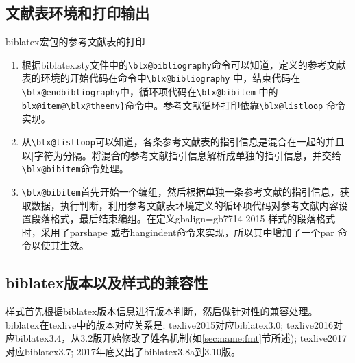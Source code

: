 \subsection{文献表环境和打印输出}
  biblatex宏包的参考文献表的打印
  \begin{enumerate}
  \item 根据biblatex.sty文件中的\verb|\blx@bibliography|命令可以知道，定义的参考文献表的环境的开始代码在命令中\verb|\blx@bibliography| 中，结束代码在\verb|\blx@endbibliography|中，循环项代码在\verb|\blx@bibitem| 中的\verb|blx@item@\blx@theenv}|命令中。参考文献循环打印依靠\verb|\blx@listloop| 命令实现。
  \item 从\verb|\blx@listloop|可以知道，各条参考文献表的指引信息是混合在一起的并且以|字符为分隔。将混合的参考文献指引信息解析成单独的指引信息，并交给\verb|\blx@bibitem|命令处理。
  \item \verb|\blx@bibitem|首先开始一个编组，然后根据单独一条参考文献的指引信息，获取数据，执行判断，利用参考文献表环境定义的循环项代码对参考文献内容设置段落格式，最后结束编组。在定义gbalign=gb7714-2015 样式的段落格式时，采用了parshape 或者hangindent命令来实现，所以其中增加了一个par 命令以使其生效。
  \end{enumerate}


\subsection{biblatex版本以及样式的兼容性}\label{sec:blx:compatibility}
样式首先根据biblatex版本信息进行版本判断，然后做针对性的兼容处理。
biblatex在texlive中的版本对应关系是:
texlive2015对应biblatex3.0;
texlive2016对应biblatex3.4，从3.2版开始修改了姓名机制(如\ref{sec:name:fmt}节所述);
texlive2017对应biblatex3.7;
2017年底又出了biblatex3.8a到3.10版。

